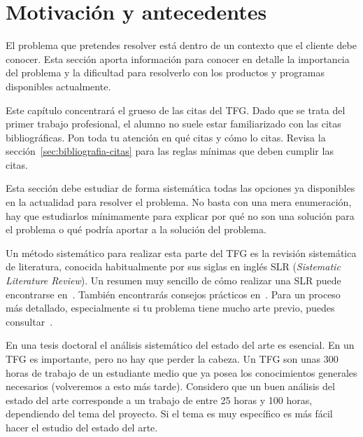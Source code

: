 \chapter{Motivación y antecedentes}
\label{ch:antecedentes}

El problema que pretendes resolver está dentro de un contexto que el cliente debe conocer.  Esta sección aporta información para conocer en detalle la importancia del problema y la dificultad para resolverlo con los productos y programas disponibles actualmente.

Este capítulo concentrará el grueso de las citas del TFG.  Dado que se trata del primer trabajo profesional, el alumno no suele estar familiarizado con las citas bibliográficas.  Pon toda tu atención en qué citas y cómo lo citas.  Revisa la sección~\ref{sec:bibliografia-citas} para las reglas mínimas que deben cumplir las citas.


Esta sección debe estudiar de forma sistemática todas las opciones ya disponibles en la actualidad para resolver el problema. No basta con una mera enumeración, hay que estudiarlos mínimamente para explicar por qué no son una solución para el problema o qué podría aportar a la solución del problema.

Un método sistemático para realizar esta parte del TFG es la revisión sistemática de literatura, conocida habitualmente por sus siglas en inglés SLR (\emph{Sistematic Literature Review}).  Un resumen muy sencillo de cómo realizar una SLR puede encontrarse en~\cite{anderskofodpetersen2014}.  También encontrarás consejos prácticos en~\cite{sandroschulze2017}.  Para un proceso más detallado, especialmente si tu problema tiene mucho arte previo, puedes consultar~\cite{barbarakitchenhamstuartcharters2007}.

En una tesis doctoral el análisis sistemático del estado del arte es esencial. En un TFG es importante, pero no hay que perder la cabeza.  Un TFG son unas 300 horas de trabajo de un estudiante medio que ya posea los conocimientos generales necesarios (volveremos a esto más tarde).  Considero que un buen análisis del estado del arte corresponde a un trabajo de entre 25 horas y 100 horas, dependiendo del tema del proyecto.  Si el tema es muy específico es más fácil hacer el estudio del estado del arte.

